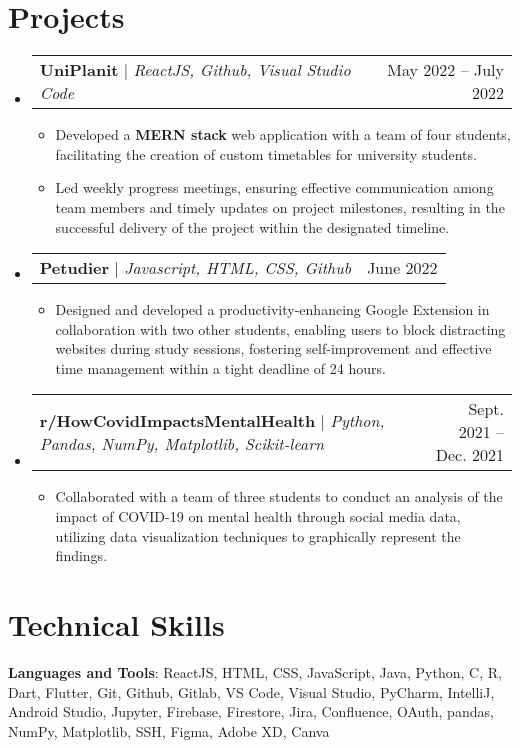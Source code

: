 \documentclass[letterpaper,11pt]{article}
\makeatletter
\newcommand{\resumeItem}[1]{
  \item\small{
    {#1 \vspace{-2pt}}
  }
}
\newcommand{\resumeProjectHeading}[2]{
    \item
    \begin{tabular*}{0.97\textwidth}{l@{\extracolsep{\fill}}r}
      \small#1 & #2 \\
    \end{tabular*}\vspace{-7pt}
}
\newcommand{\resumeSubHeadingListStart}{\begin{itemize}[leftmargin=0.15in, label={}]}
\newcommand{\resumeSubHeadingListEnd}{\end{itemize}}
\newcommand{\resumeItemListStart}{\begin{itemize}}
\newcommand{\resumeItemListEnd}{\end{itemize}\vspace{-5pt}}
\makeatother
\begin{document}
\section{Projects}
    \resumeSubHeadingListStart
      \resumeProjectHeading
          {\textbf{UniPlanit} $|$ \emph{ReactJS,  Github, Visual Studio Code}}{May 2022 -- July 2022}
          \resumeItemListStart
            \resumeItem{Developed a \textbf{MERN stack} web application with a team of four students, facilitating the creation of custom timetables for university students.}
            \resumeItem{Led weekly progress meetings, ensuring effective communication among team members and timely updates on project milestones, resulting in the successful delivery of the project within the designated timeline.}
          \resumeItemListEnd
      \resumeProjectHeading
          {\textbf{Petudier} $|$ \emph{Javascript, HTML, CSS, Github}}{June 2022}
          \resumeItemListStart
            \resumeItem{Designed and developed a productivity-enhancing Google Extension in collaboration with two other students, enabling users to block distracting websites during study sessions, fostering self-improvement and effective time management within a tight deadline of 24 hours.}
          \resumeItemListEnd
        \resumeProjectHeading   {\textbf{r/HowCovidImpactsMentalHealth} $|$ \emph{Python, Pandas, NumPy, Matplotlib, Scikit-learn}}{Sept. 2021 -- Dec. 2021}
          \resumeItemListStart
            \resumeItem{Collaborated with a team of three students to conduct an analysis of the impact of COVID-19 on mental health through social media data, utilizing data visualization techniques to graphically represent the findings.}
          \resumeItemListEnd
    \resumeSubHeadingListEnd



%
\section{Technical Skills}
 \begin{itemize}[leftmargin=0.15in, label={}]
    \small{\item{
     \textbf{Languages and Tools}{: ReactJS, HTML, CSS, JavaScript, Java, Python, C, R, Dart, Flutter, Git, Github, Gitlab, VS Code, Visual Studio, PyCharm, IntelliJ, Android Studio, Jupyter, Firebase, Firestore, Jira, Confluence, OAuth, pandas, NumPy, Matplotlib, SSH, Figma, Adobe XD, Canva} \\
    }}
 \end{itemize}


\end{document}
